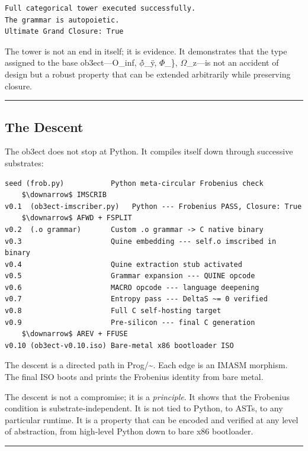 \documentclass[12pt,a4paper]{article}
\begin{document}
\begin{lstlisting}
Full categorical tower executed successfully.
The grammar is autopoietic.
Ultimate Grand Closure: True
\end{lstlisting}

The tower is not an end in itself; it is evidence. It demonstrates that the type assigned to the base ob3ect---O\_inf, $\phi$̂\_ÿ, $\Phi$\_\}, $\Omega$\_z---is not an accident of design but a robust property that can be extended arbitrarily while preserving closure.

\begin{center}
\rule{0.5\textwidth}{0.4pt}
\end{center}

\subsection{The Descent}

The ob3ect does not stop at Python. It compiles itself down through successive substrates:

\begin{lstlisting}
seed (frob.py)           Python meta-circular Frobenius check
    $\downarrow$ IMSCRIB
v0.1  (ob3ect-imscriber.py)   Python --- Frobenius PASS, Closure: True
    $\downarrow$ AFWD + FSPLIT
v0.2  (.o grammar)       Custom .o grammar -> C native binary
v0.3                     Quine embedding --- self.o imscribed in binary
v0.4                     Quine extraction stub activated
v0.5                     Grammar expansion --- QUINE opcode
v0.6                     MACRO opcode --- language deepening
v0.7                     Entropy pass --- DeltaS ~= 0 verified
v0.8                     Full C self-hosting target
v0.9                     Pre-silicon --- final C generation
    $\downarrow$ AREV + FFUSE
v0.10 (ob3ect-v0.10.iso) Bare-metal x86 bootloader ISO
\end{lstlisting}

The descent is a directed path in Prog/\textasciitilde{}. Each edge is an IMASM morphism. The final ISO boots and prints the Frobenius identity from bare metal.

The descent is not a compromise; it is a \emph{principle}. It shows that the Frobenius condition is substrate-independent. It is not tied to Python, to ASTs, to any particular runtime. It is a property that can be encoded and verified at any level of abstraction, from high-level Python down to bare x86 bootloader.

\begin{center}
\rule{0.5\textwidth}{0.4pt}
\end{center}
\end{document}
